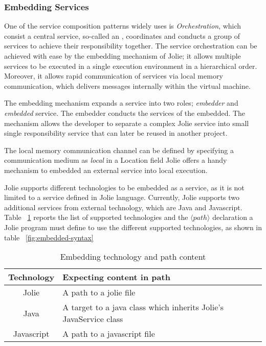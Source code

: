 \subsubsection{Embedding Services}
\label{sec:embedded}

One of the service composition patterns widely uses is \textit{Orchestration}, which consist a central service, so-called an , coordinates and conducts a group of services to achieve their responsibility together. The service orchestration can be achieved with ease by the embedding mechanism of Jolie; it allows multiple services to be executed in a single execution environment in a hierarchical order.
Moreover, it allows rapid communication of services via local memory communication, which delivers messages internally within the virtual machine.

The embedding mechanism expands a service into two roles; \textit{embedder} and \textit{embedded} service. The embedder conducts the services of the embedded. The mechanism allows the developer to separate a complex Jolie service into small single responsibility service that can later be reused in another project. 

The local memory communication channel can be defined by specifying a communication medium as \textit{local} in a Location field
Jolie offers a handy mechanism to embedded an external service into local execution.

Jolie supports different technologies to be embedded as a service, as it is not limited to a service defined in Jolie language. Currently, Jolie supports two additional services from external technology, which are Java and Javascript. Table ~\ref{table:embedded-technology-path} reports the list of supported technologies and the \(\langle path \rangle\) declaration a Jolie program must define to use the different supported technologies, as shown in table ~\ref{fig:embedded-syntax}

\begin{table}[h]
    \centering
    \begin{tabular}{ |c|l| }
        \hline
        Technology & Expecting content in path                                         \\
        \hline
        Jolie      & A path to a jolie file                                            \\
        Java       & A target to a java class which inherits Jolie's JavaService class \\
        Javascript & A path to a javascript file                                       \\
        \hline
    \end{tabular}
    \caption{Embedding technology and path content}
    \label{table:embedded-technology-path}
\end{table}


